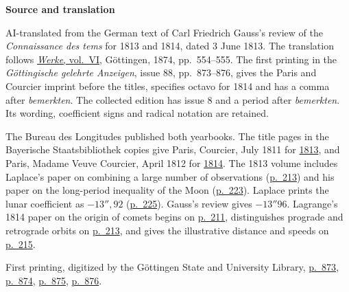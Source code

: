 \clearpage\thispagestyle{empty}
\begin{center}\textbf{Source and translation}\end{center}
\hypertarget{connaissance1813-source-note}{}\label{connaissance1813-source-note}
\noindent AI-translated from the German text of Carl Friedrich Gauss's review of the \emph{Connaissance des tems} for 1813 and 1814, dated 3 June 1813. The translation follows \href{https://gdz.sub.uni-goettingen.de/id/PPN236007467}{\emph{Werke}, vol.\ VI}, Göttingen, 1874, pp.\ 554--555. The first printing in the \emph{Göttingische gelehrte Anzeigen}, issue 88, pp.\ 873--876, gives the Paris and Courcier imprint before the titles, specifies octavo for 1814 and has a comma after \emph{bemerkten}. The collected edition has issue 8 and a period after \emph{bemerkten}. Its wording, coefficient signs and radical notation are retained.

\noindent The Bureau des Longitudes published both yearbooks. The title pages in the Bayerische Staatsbibliothek copies give Paris, Courcier, July 1811 for \href{https://api.digitale-sammlungen.de/iiif/image/v2/bsb10538233_00005/full/1450,/0/default.jpg}{1813}, and Paris, Madame Veuve Courcier, April 1812 for \href{https://api.digitale-sammlungen.de/iiif/image/v2/bsb10538234_00005/full/1450,/0/default.jpg}{1814}. The 1813 volume includes Laplace's paper on combining a large number of observations (\href{https://api.digitale-sammlungen.de/iiif/image/v2/bsb10538233_00217/full/1450,/0/default.jpg}{p.\ 213}) and his paper on the long-period inequality of the Moon (\href{https://api.digitale-sammlungen.de/iiif/image/v2/bsb10538233_00227/full/1450,/0/default.jpg}{p.\ 223}). Laplace prints the lunar coefficient as $-13''{,}92$ (\href{https://api.digitale-sammlungen.de/iiif/image/v2/bsb10538233_00229/full/1450,/0/default.jpg}{p.\ 225}). Gauss's review gives $-13''96$. Lagrange's 1814 paper on the origin of comets begins on \href{https://api.digitale-sammlungen.de/iiif/image/v2/bsb10538234_00215/full/1450,/0/default.jpg}{p.\ 211}, distinguishes prograde and retrograde orbits on \href{https://api.digitale-sammlungen.de/iiif/image/v2/bsb10538234_00217/full/1450,/0/default.jpg}{p.\ 213}, and gives the illustrative distance and speeds on \href{https://api.digitale-sammlungen.de/iiif/image/v2/bsb10538234_00219/full/1450,/0/default.jpg}{p.\ 215}.

\noindent First printing, digitized by the Göttingen State and University Library, \href{https://images.p.sub.uni-goettingen.de/iiif/image/gdz:PPN319721507_1813:00000877/full/1650,/0/default.jpg}{p.\ 873}, \href{https://images.p.sub.uni-goettingen.de/iiif/image/gdz:PPN319721507_1813:00000878/full/1650,/0/default.jpg}{p.\ 874}, \href{https://images.p.sub.uni-goettingen.de/iiif/image/gdz:PPN319721507_1813:00000879/full/1650,/0/default.jpg}{p.\ 875}, \href{https://images.p.sub.uni-goettingen.de/iiif/image/gdz:PPN319721507_1813:00000880/full/1650,/0/default.jpg}{p.\ 876}.
\clearpage
